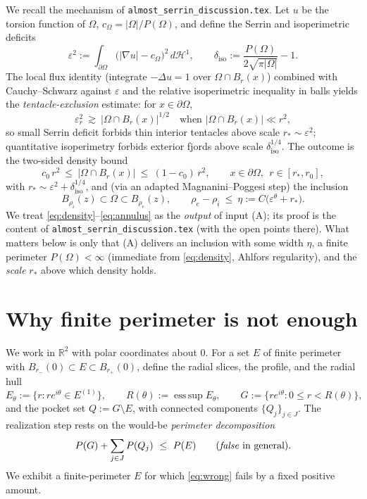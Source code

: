 \documentclass[11pt]{article}
\theoremstyle{definition}
\newcommand{\R}{\mathbb R}
\newcommand{\Om}{\Omega}
\newcommand{\HH}{\mathcal H}
\newcommand{\eps}{\varepsilon}
\newcommand{\esssup}{\operatorname*{ess\,sup}}
\newcommand{\abs}[1]{\left|#1\right|}
\begin{document}
We recall the mechanism of \texttt{almost\_serrin\_discussion.tex}. Let
$u$ be the torsion function of $\Om$, $c_\Om=|\Om|/P(\Om)$, and define the
Serrin and isoperimetric deficits
\[
   \eps^2:=\int_{\partial\Om}\bigl(|\nabla u|-c_\Om\bigr)^2\,d\HH^{1},
   \qquad
   \delta_{\mathrm{iso}}:=\frac{P(\Om)}{2\sqrt{\pi|\Om|}}-1 .
\]
The local flux identity (integrate $-\Delta u=1$ over $\Om\cap B_r(x)$)
combined with Cauchy--Schwarz against $\eps$ and the relative
isoperimetric inequality in balls yields the \emph{tentacle-exclusion}
estimate: for $x\in\partial\Om$,
\[
   \eps_r^2\ \gtrsim\ \abs{\Om\cap B_r(x)}^{1/2}
   \quad\text{when }\abs{\Om\cap B_r(x)}\ll r^2,
\]
so small Serrin deficit forbids thin interior tentacles above scale
$r_*\sim\eps^{2}$; quantitative isoperimetry forbids exterior fjords above
scale $\delta_{\mathrm{iso}}^{1/4}$. The outcome is the two-sided density
bound
\begin{equation}\label{eq:density}
   c_0\,r^2\ \le\ \abs{\Om\cap B_r(x)}\ \le\ (1-c_0)\,r^2,
   \qquad x\in\partial\Om,\ \ r\in[r_*,r_0],
\end{equation}
with $r_*\sim\eps^{2}+\delta_{\mathrm{iso}}^{1/4}$, and (via an adapted
Magnanini--Poggesi step) the inclusion
\begin{equation}\label{eq:annulus}
   B_{\rho_i}(z)\subset\Om\subset B_{\rho_e}(z),
   \qquad
   \rho_e-\rho_i\ \le\ \eta:=C\bigl(\eps^{\theta}+r_*\bigr).
\end{equation}
We treat \eqref{eq:density}--\eqref{eq:annulus} as the \emph{output} of
input (A); its proof is the content of
\texttt{almost\_serrin\_discussion.tex} (with the open points there). What
matters below is only that (A) delivers an inclusion with some width
$\eta$, a finite perimeter $P(\Om)<\infty$ (immediate from
\eqref{eq:density}, Ahlfors regularity), and the \emph{scale} $r_*$ above
which density holds.

\section{Why finite perimeter is not enough}
\label{sec:counterexample}

We work in $\R^2$ with polar coordinates about $0$. For a set $E$ of
finite perimeter with $B_{r_-}(0)\subset E\subset B_{r_+}(0)$, define the
radial slices, the profile, and the radial hull
\begin{equation}\label{eq:hull}
   E_\theta:=\{r:re^{i\theta}\in E^{(1)}\},\qquad
   R(\theta):=\esssup E_\theta,\qquad
   G:=\{re^{i\theta}:0\le r<R(\theta)\},
\end{equation}
and the pocket set $Q:=G\setminus E$, with connected components
$\{Q_j\}_{j\in J}$. The realization step rests on the would-be
\emph{perimeter decomposition}
\begin{equation}\label{eq:wrong}
   P(G)+\sum_{j\in J}P(Q_j)\ \le\ P(E)
   \qquad(\text{\emph{false} in general}).
\end{equation}
We exhibit a finite-perimeter $E$ for which \eqref{eq:wrong} fails by a
fixed positive amount.
\end{document}
